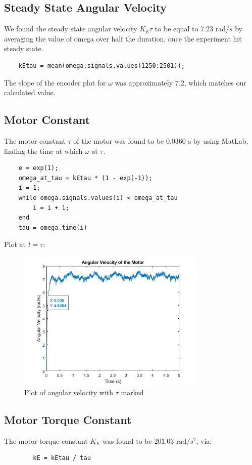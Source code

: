 \subsection{Steady State Angular Velocity}

We found the steady state angular velocity $K_{E}\tau $ to be equal to $7.23 \text{ rad}/s$  by averaging the value of omega over half the duration, once the experiment hit steady state. 

\begin{verbatim}
    kEtau = mean(omega.signals.values(1250:2501));
\end{verbatim}

The slope of the encoder plot for $\omega$ was approximately $7.2$, which matches our calculated value. 
\subsection{Motor Constant}

The motor constant $\tau $ of the motor was found to be $0.0360 \text{ s}$ by using MatLab, finding the time at which $\omega$ at $\tau $.
\begin{verbatim}
    e = exp(1);
    omega_at_tau = kEtau * (1 - exp(-1));
    i = 1;
    while omega.signals.values(i) < omega_at_tau
        i = i + 1;  
    end
    tau = omega.time(i)	
\end{verbatim}
Plot at $t = \tau $:
\begin{figure}[H]
	\centering
	\includegraphics[width=0.8\textwidth]{./figures/omega_plot_at_tau.jpg}
	\caption{Plot of angular velocity with $\tau $ marked}
	\label{fig:omega_plot_at_tau}
\end{figure}

\subsection{Motor Torque Constant}
The motor torque constant $K_{E}$ was found to be $201.03 \text{ rad}/s^2$, via:
\begin{verbatim}
        kE = kEtau / tau
\end{verbatim}
